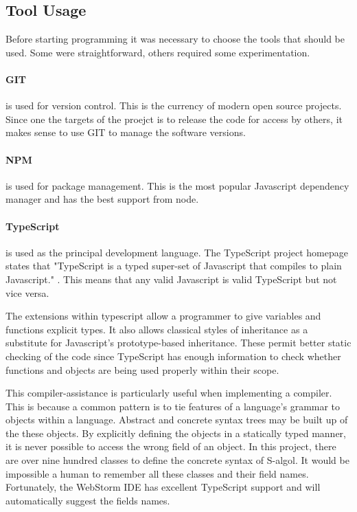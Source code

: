 \documentclass{article}
\begin{document}
\subsection{Tool Usage}

Before starting programming it was necessary to choose the tools that should be used. Some were straightforward, others required some experimentation.

\paragraph{GIT} is used for version control. This is the currency of modern open source projects. Since one the targets of the proejct is to release the code for access by others, it makes sense to use GIT to manage the software versions.

\paragraph{NPM} is used for package management. This is the most popular Javascript dependency manager and has the best support from node.

\paragraph{TypeScript} is used as the principal development language. The TypeScript project homepage states that "TypeScript is a typed super-set of Javascript that compiles to plain Javascript." \cite{typescript}. This means that any valid Javascript is valid TypeScript but not vice versa.

The extensions within typescript allow a programmer to give variables and functions explicit types. It also allows classical styles of inheritance as a substitute for Javascript's prototype-based inheritance. These permit better static checking of the code since TypeScript has enough information to check whether functions and objects are being used properly within their scope.

This compiler-assistance is particularly useful when implementing a compiler. This is because a common pattern is to tie features of a language's grammar to objects within a language. Abstract and concrete syntax trees may be built up of the these objects. By explicitly defining the objects in a statically typed manner, it is never possible to access the wrong field of an object. In this project, there are over nine hundred classes to define the concrete syntax of S-algol. It would be impossible a human to remember all these classes and their field names. Fortunately, the WebStorm IDE has excellent TypeScript support and will automatically suggest the fields names.
\end{document}
